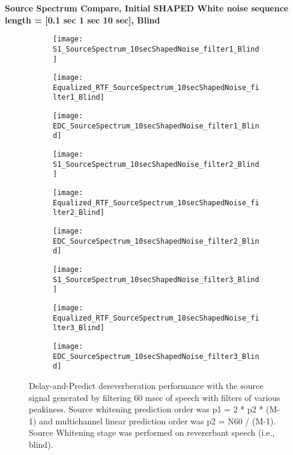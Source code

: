 \textbf{Source Spectrum Compare, Initial SHAPED White noise sequence length = [0.1 sec 1 sec  10 sec], Blind}

\begin{figure}[H]
	\centering
	\begin{subfigure}[b]{0.3\textwidth}
		\centering
		\texttt{[image: S1\_SourceSpectrum\_10secShapedNoise\_filter1\_Blind]}
	\end{subfigure}
	\begin{subfigure}[b]{0.3\textwidth}
		\centering
		\texttt{[image: Equalized\_RTF\_SourceSpectrum\_10secShapedNoise\_filter1\_Blind]}
	\end{subfigure}
	\begin{subfigure}[b]{0.3\textwidth}
		\centering
		\texttt{[image: EDC\_SourceSpectrum\_10secShapedNoise\_filter1\_Blind]}
	\end{subfigure}
	\begin{subfigure}[b]{0.3\textwidth}
		\centering
		\texttt{[image: S1\_SourceSpectrum\_10secShapedNoise\_filter2\_Blind]}
	\end{subfigure}
	\begin{subfigure}[b]{0.3\textwidth}
		\centering
		\texttt{[image: Equalized\_RTF\_SourceSpectrum\_10secShapedNoise\_filter2\_Blind]}
	\end{subfigure}
	\begin{subfigure}[b]{0.3\textwidth}
		\centering
		\texttt{[image: EDC\_SourceSpectrum\_10secShapedNoise\_filter2\_Blind]}
	\end{subfigure}
		\begin{subfigure}[b]{0.3\textwidth}
		\centering
		\texttt{[image: S1\_SourceSpectrum\_10secShapedNoise\_filter3\_Blind]}
	\end{subfigure}
	\begin{subfigure}[b]{0.3\textwidth}
		\centering
		\texttt{[image: Equalized\_RTF\_SourceSpectrum\_10secShapedNoise\_filter3\_Blind]}
	\end{subfigure}
	\begin{subfigure}[b]{0.3\textwidth}
		\centering
		\texttt{[image: EDC\_SourceSpectrum\_10secShapedNoise\_filter3\_Blind]}
	\end{subfigure}
	\caption{Delay-and-Predict dereverberation performance with the source signal generated by filtering 60 msec of speech with filters of various peakiness. Source whitening prediction order was p1 = 2 * p2 * (M-1) and multichannel linear prediction order was p2 = N60 / (M-1). Source Whitening stage was performed on revererbant speech (i.e., blind).}
	\label{fig:params_source_spectrum_shaped_compare}
\end{figure}

